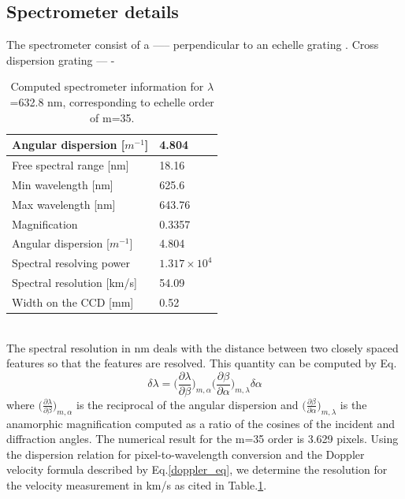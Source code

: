 \documentclass[authoryear, 12pt,5p, times]{elsarticle}
\begin{document}
\subsection{Spectrometer details}
The spectrometer consist of a ----- perpendicular to an echelle grating . Cross dispersion grating --- -
\hspace{-20pt}
\begin{table}
    \begin{tabular}{|l|l}
    \hline Angular dispersion [$m^{-1}$]  & 4.804                     \\ \hline     \hline Free spectral range [nm]           & 18.16                     \\     \hline Min wavelength [nm]  & 625.6
 \\  \hline  Max wavelength [nm]  &  643.76 
 \\ \hline Magnification   & 0.3357                
 \\ \hline  \hline     Angular dispersion [$m^{-1}$]  & 4.804                   \\ \hline   Spectral resolving power  & $1.317\times10^4$\\ 
    \hline Spectral resolution [km/s]   & 54.09        \\ 
   \hline Width on the CCD [mm]   & 0.52                      \\
    \end{tabular}
  
    \caption{Computed spectrometer information for $\lambda $=632.8 nm, corresponding to echelle order of  m=35. }
  \label{spec_prop}\end{table}
 \\The spectral resolution in nm deals with the distance between two closely spaced features so that the features are resolved. This quantity can be computed by Eq.\label{spectral_resolution}
\begin{equation}
\delta\lambda=\Bigg(\frac{\partial\lambda}{\partial\beta}\Bigg)_{m,\alpha}\Bigg(\frac{\partial\beta}{\partial\alpha}\Bigg)_{m,\lambda}\delta\alpha
\label{spectral_resolution}
\end{equation}
where $\Big(\frac{\partial\lambda}{\partial\beta}\Big)_{m,\alpha}$ is the reciprocal of the angular dispersion and $\Big(\frac{\partial\beta}{\partial\alpha}\Big)_{m,\lambda}$ is the anamorphic magnification computed as a ratio of the cosines of the incident and diffraction angles. The numerical result for the m=35 order is 3.629 pixels. Using the dispersion relation for pixel-to-wavelength conversion and the Doppler velocity formula described by Eq.\ref{doppler_eq}, we determine the resolution for the velocity measurement in km/s as cited in Table.\ref{spec_prop}.
\end{document}
